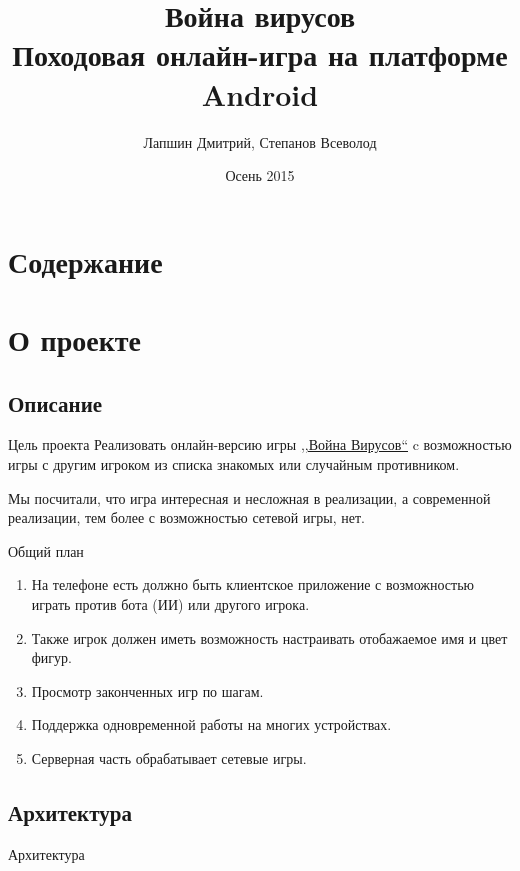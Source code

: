 \documentclass{beamer}
\title[Война вирусов]{Война вирусов\\Походовая онлайн-игра на платформе Android}
\author{Лапшин Дмитрий, Степанов Всеволод}
\institute{СПб АУ РАН}
\date{Осень 2015}
\makeatletter
\newcommand*{\currentname}{\@currentlabelname}
\newcommand{\cimg}[2]{%
	\begin{center}%
		\ifthenelse{\equal{#2}{}}{%
			\texttt{[image: \#1]}
		}{%
			\texttt{[image: \#1]}
		}%
	\end{center}%
}
\makeatother
\begin{document}
\begin{frame}
	\titlepage
\end{frame}

\section{Содержание}

\begin{frame}[t]{\currentname}
	\tableofcontents
\end{frame}

\section{О проекте}
\subsection{Описание}

\begin{frame}[t]{Цель проекта}
	Реализовать онлайн-версию игры
	\href{https://ru.wikipedia.org/wiki/\%D0\%92\%D0\%BE\%D0\%B9\%D0\%BD\%D0\%B0\_\%D0\%B2\%D0\%B8\%D1\%80\%D1\%83\%D1\%81\%D0\%BE\%D0\%B2}{,,Война Вирусов``}
	c возможностью игры с другим игроком из списка знакомых или случайным противником.

	\cimg{01.png}{0.25}

	Мы посчитали, что игра интересная и несложная в реализации, а современной реализации, тем более с возможностью сетевой игры, нет.
\end{frame}

\begin{frame}[t]{Общий план}
	\begin{enumerate}
		\item На телефоне есть должно быть клиентское приложение с возможностью играть против бота (ИИ) или другого игрока.
		\item Также игрок должен иметь возможность настраивать отобажаемое имя и цвет фигур.
		\item Просмотр законченных игр по шагам.
		\item Поддержка одновременной работы на многих устройствах.
		\item Серверная часть обрабатывает сетевые игры.
	\end{enumerate}
\end{frame}
\subsection{Архитектура}
\begin{frame}[t]{Архитектура}
	\cimg{04.png}{0.7}
\end{frame}
\end{document}
